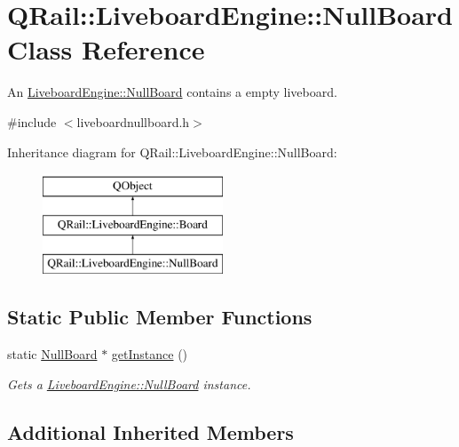 \hypertarget{classQRail_1_1LiveboardEngine_1_1NullBoard}{}\section{Q\+Rail\+::Liveboard\+Engine\+::Null\+Board Class Reference}
\label{classQRail_1_1LiveboardEngine_1_1NullBoard}


An \mbox{\hyperlink{classQRail_1_1LiveboardEngine_1_1NullBoard}{Liveboard\+Engine\+::\+Null\+Board}} contains a empty liveboard.  




{\ttfamily \#include $<$liveboardnullboard.\+h$>$}

Inheritance diagram for Q\+Rail\+::Liveboard\+Engine\+::Null\+Board\+:\begin{figure}[H]
\begin{center}
\leavevmode
\includegraphics[height=3.000000cm]{classQRail_1_1LiveboardEngine_1_1NullBoard}
\end{center}
\end{figure}
\subsection*{Static Public Member Functions}
\begin{DoxyCompactItemize}
\item 
static \mbox{\hyperlink{classQRail_1_1LiveboardEngine_1_1NullBoard}{Null\+Board}} $\ast$ \mbox{\hyperlink{classQRail_1_1LiveboardEngine_1_1NullBoard_a2d20874ccfcb5be744626e3b97b036fa}{get\+Instance}} ()
\begin{DoxyCompactList}\small\item\em Gets a \mbox{\hyperlink{classQRail_1_1LiveboardEngine_1_1NullBoard}{Liveboard\+Engine\+::\+Null\+Board}} instance. \end{DoxyCompactList}\end{DoxyCompactItemize}
\subsection*{Additional Inherited Members}



